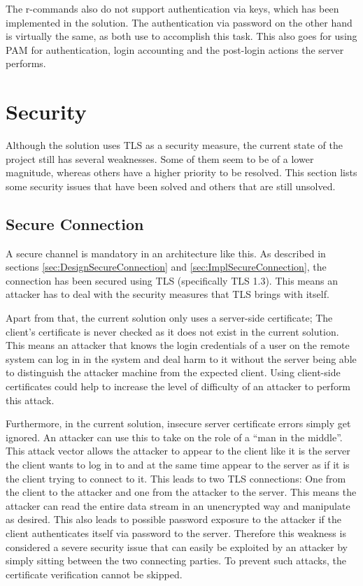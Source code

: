 \documentclass[10pt,a4paper,titlepage,twoside,english,final]{zhawreprt}
\begin{document}
The r-commands also do not support authentication via keys, which has been implemented in the solution.
The authentication via password on the other hand is virtually the same, as both use \cite{login} to accomplish this task.
This also goes for using \gls{PAM} for authentication, \gls{login} accounting and the post-\gls{login} actions the server performs.


\section{Security}\label{sec:Security}
Although the solution uses \gls{TLS} as a security measure, the current state of the project still has several weaknesses.
Some of them seem to be of a lower magnitude, whereas others have a higher priority to be resolved.
This section lists some security issues that have been solved and others that are still unsolved.

\subsection{Secure Connection}\label{ssec:SecSecureConnection}
A secure channel is mandatory in an architecture like this.
As described in sections \ref{sec:DesignSecureConnection} and \ref{sec:ImplSecureConnection}, the connection has been secured using \gls{TLS} (specifically \gls{TLS} 1.3).
This means an attacker has to deal with the security measures that \gls{TLS} brings with itself.

Apart from that, the current solution only uses a server-side certificate;
The client's certificate is never checked as it does not exist in the current solution.
This means an attacker that knows the \gls{login} credentials of a user on the remote system can log in in the system and deal harm to it without the server being able to distinguish the attacker machine from the expected client.
Using client-side certificates could help to increase the level of difficulty of an attacker to perform this attack.

Furthermore, in the current solution, insecure server certificate errors simply get ignored.
An attacker can use this to take on the role of a ``man in the middle''.
This attack vector allows the attacker to appear to the client like it is the server the client wants to log in to and at the same time appear to the server as if it is the client trying to connect to it.
This leads to two \gls{TLS} connections:
One from the client to the attacker and one from the attacker to the server.
This means the attacker can read the entire data stream in an unencrypted way and manipulate as desired.
This also leads to possible password exposure to the attacker if the client authenticates itself via password to the server.
Therefore this weakness is considered a severe security issue that can easily be exploited by an attacker by simply sitting between the two connecting parties.
To prevent such attacks, the certificate verification cannot be skipped.
\end{document}
